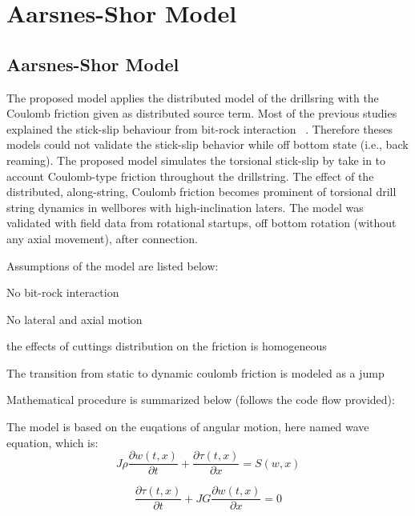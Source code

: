 \newpage
\chapter{Aarsnes-Shor Model}

\section{Aarsnes-Shor Model}

The proposed model applies the distributed model of the drillsring with the Coulomb friction given as distributed source term. Most of the previous studies explained the stick-slip behaviour from bit-rock interaction ~\cite{ref:germay2009a, ref:richard2007a, ref:zhang2020a}. Therefore theses models could not validate the stick-slip behavior while off bottom state (i.e., back reaming). The proposed model simulates the torsional stick-slip by take in to account Coulomb-type friction throughout the drillstring. The effect of the distributed, along-string, Coulomb friction becomes prominent of torsional drill string dynamics in wellbores with high-inclination laters. The model was validated with field data from rotational startups, off bottom rotation (without any axial movement), after connection.

Assumptions of the model are listed below:
\begin{bulletedlist}
    \item No bit-rock interaction
    \item No lateral and axial motion
    \item the effects of cuttings distribution on the friction is homogeneous
    \item The transition from static to dynamic coulomb friction is modeled as a jump
\end{bulletedlist}


\noindent Mathematical procedure is summarized below (follows the code flow provided):

The model is based on the euqations of angular motion, here named wave equation, which is:
\begin{equation}\label{AS-motion}
  J\rho\frac{\partial w(t,x)}{\partial t} + \frac{\partial \tau (t,x)}{\partial x} = S(w,x) 
\end{equation}

\begin{equation}
 \frac{\partial\tau(t,x)}{\partial t} + JG\frac{\partial w(t,x)}{\partial x} = 0 
\end{equation}


